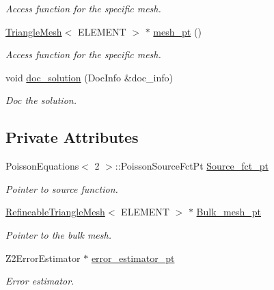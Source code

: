 \begin{DoxyCompactItemize}
\begin{DoxyCompactList}\small\item\em Access function for the specific mesh. \end{DoxyCompactList}\item 
\hyperlink{classoomph_1_1TriangleMesh}{Triangle\+Mesh}$<$ E\+L\+E\+M\+E\+NT $>$ $\ast$ \hyperlink{classPoissonProblem_ad428aa9392108f968db64534fc23ba86}{mesh\+\_\+pt} ()
\begin{DoxyCompactList}\small\item\em Access function for the specific mesh. \end{DoxyCompactList}\item 
void \hyperlink{classPoissonProblem_aab6f503fa242f687bb8452527bb7688f}{doc\+\_\+solution} (Doc\+Info \&doc\+\_\+info)
\begin{DoxyCompactList}\small\item\em Doc the solution. \end{DoxyCompactList}\end{DoxyCompactItemize}
\subsection*{Private Attributes}
\begin{DoxyCompactItemize}
\item 
Poisson\+Equations$<$ 2 $>$\+::Poisson\+Source\+Fct\+Pt \hyperlink{classPoissonProblem_a32b954cca3c38175d0816f92e1c0da46}{Source\+\_\+fct\+\_\+pt}
\begin{DoxyCompactList}\small\item\em Pointer to source function. \end{DoxyCompactList}\item 
\hyperlink{classoomph_1_1RefineableTriangleMesh}{Refineable\+Triangle\+Mesh}$<$ E\+L\+E\+M\+E\+NT $>$ $\ast$ \hyperlink{classPoissonProblem_a4f4561d2155399268d45b2f86a61389a}{Bulk\+\_\+mesh\+\_\+pt}
\begin{DoxyCompactList}\small\item\em Pointer to the bulk mesh. \end{DoxyCompactList}\item 
Z2\+Error\+Estimator $\ast$ \hyperlink{classPoissonProblem_a63fc4a21e050c0b3d2ba16829af232e8}{error\+\_\+estimator\+\_\+pt}
\begin{DoxyCompactList}\small\item\em Error estimator. \end{DoxyCompactList}\end{DoxyCompactItemize}


